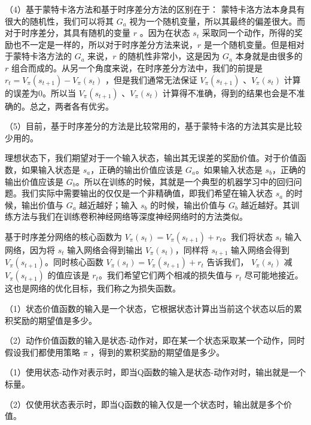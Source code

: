 （4）基于蒙特卡洛方法和基于时序差分方法的区别在于： 蒙特卡洛方法本身具有很大的随机性，我们可以将其 $G_a$ 视为一个随机变量，所以其最终的偏差很大。而对于时序差分，其具有随机的变量 $r$ 。因为在状态 $s_t$ 采取同一个动作，所得的奖励也不一定是一样的，所以对于时序差分方法来说，$r$ 是一个随机变量。但是相对于蒙特卡洛方法的 $G_a$ 来说，$r$ 的随机性非常小，这是因为 $G_a$ 本身就是由很多的 $r$ 组合而成的。从另一个角度来说，在时序差分方法中，我们的前提是 $r_t=V_{\pi}\left(s_{t+1}\right)-V_{\pi}\left(s_{t}\right)$ ，但是我们通常无法保证 $V_{\pi}\left(s_{t+1}\right)$ 、$V_{\pi}\left(s_{t}\right)$ 计算的误差为0。所以当 $V_{\pi}\left(s_{t+1}\right)$ 、$V_{\pi}\left(s_{t}\right)$ 计算得不准确，得到的结果也会是不准确的。总之，两者各有优劣。

（5）目前，基于时序差分的方法是比较常用的，基于蒙特卡洛的方法其实是比较少用的。


理想状态下，我们期望对于一个输入状态，输出其无误差的奖励价值。对于价值函数，如果输入状态是 $s_a$，正确的输出价值应该是 $G_a$。如果输入状态是 $s_b$，正确的输出价值应该是 $G_b$。所以在训练的时候，其就是一个典型的机器学习中的回归问题。我们实际中需要输出的仅仅是一个非精确值，即我们希望在输入状态 $s_a$ 的时候，输出价值与 $G_a$ 越近越好；输入 $s_b$ 的时候，输出价值与 $G_b$ 越近越好。其训练方法与我们在训练卷积神经网络等深度神经网络时的方法类似。


基于时序差分网络的核心函数为 $V_{\pi}\left(s_{t}\right)=V_{\pi}\left(s_{t+1}\right)+r_{t}$。我们将状态 $s_t$ 输入网络，因为将 $s_t$ 输入网络会得到输出 $V_{\pi}(s_t)$，同样将 $s_{t+1}$ 输入网络会得到$V_{\pi}(s_{t+1})$。同时核心函数 $V_{\pi}\left(s_{t}\right)=V_{\pi}\left(s_{t+1}\right)+r_{t}$  告诉我们， $V_{\pi}(s_t)$ 减 $V_{\pi}(s_{t+1})$ 的值应该是 $r_t$。我们希望它们两个相减的损失值与 $r_t$ 尽可能地接近。这也是网络的优化目标，我们称之为损失函数。


（1）状态价值函数的输入是一个状态，它根据状态计算出当前这个状态以后的累积奖励的期望值是多少。

（2）动作价值函数的输入是状态-动作对，即在某一个状态采取某一个动作，同时假设我们都使用策略 $\pi$ ，得到的累积奖励的期望值是多少。


（1）使用状态-动作对表示时，即当Q函数的输入是状态-动作对时，输出就是一个标量。

（2）仅使用状态表示时，即当Q函数的输入仅是一个状态时，输出就是多个价值。

